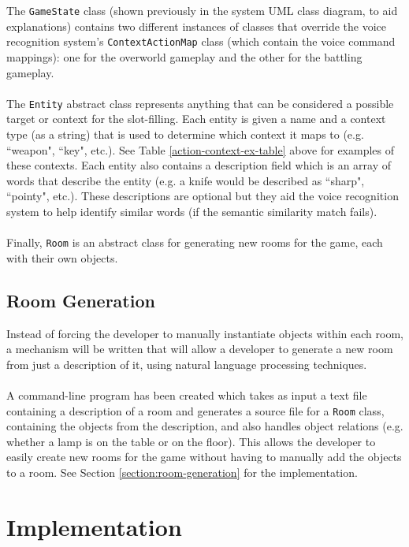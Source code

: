 \documentclass[11pt]{article}
\begin{document}
The \texttt{GameState} class (shown previously in the system UML class diagram, to aid explanations) contains two different instances of classes that override the voice recognition system's \texttt{ContextActionMap} class (which contain the voice command mappings): one for the overworld gameplay and the other for the battling gameplay.
\\
\\
The \texttt{Entity} abstract class represents anything that can be considered a possible target or context for the slot-filling. Each entity is given a name and a context type (as a string) that is used to determine which context it maps to (e.g. ``weapon", ``key", etc.). See Table \ref{action-context-ex-table} above for examples of these contexts. Each entity also contains a description field which is an array of words that describe the entity (e.g. a knife would be described as ``sharp", ``pointy", etc.). These descriptions are optional but they aid the voice recognition system to help identify similar words (if the semantic similarity match fails).
\\
\\
Finally, \texttt{Room} is an abstract class for generating new rooms for the game, each with their own objects.

\newpage
\subsection{Room Generation}

Instead of forcing the developer to manually instantiate objects within each room, a mechanism will be written that will allow a developer to generate a new room from just a description of it, using natural language processing techniques.
\\
\\
A command-line program has been created which takes as input a text file containing a description of a room and generates a source file for a \texttt{Room} class, containing the objects from the description, and also handles object relations (e.g. whether a lamp is on the table or on the floor). This allows the developer to easily create new rooms for the game without having to manually add the objects to a room. See Section \ref{section:room-generation} for the implementation.

\newpage
\section{Implementation}
\end{document}
